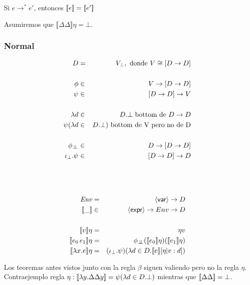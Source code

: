     \begin{corollary}
      Si $e \to^{\ast} e'$, entonces $[\![e]\!] = [\![e']\!]$
    \end{corollary}
        
    \PN Asumiremos que $\llbracket\Delta \Delta\rrbracket\eta = \bot$.

    \subsubsection{Normal}
      \begin{multicols}{2}
        \begin{eqnarray*}
          D &=& V_\bot, \text{ donde } V \cong [D \to  D] \\ \\
          \phi &\in& V \to  [D \to  D] \\
          \psi &\in& [D \to  D] \to  V \\ \\ 
          \lambda d &\in& D. \bot \text{ bottom de } D \rightarrow D \\
          \psi(\lambda d &\in& D. \bot) \text{ bottom de V pero no de D} \\ \\
          \phi_{\botbot} &\in& D \to  [D \to  D] \\
          \iota_\bot . \psi &\in& [D \to  D] \to  D
        \end{eqnarray*}
        \begin{eqnarray*}
          \\ \\ \\
          \Env &=& \var \to  D \\
          \llbracket\_\rrbracket &\in& \expr \to  Env \to  D \\ \\
          \llbracket v \rrbracket\eta &=& \eta v \\
          \llbracket e_0\, e_1\rrbracket\eta &=& \phi_{\botbot} (\llbracket e_0\rrbracket\eta) (\llbracket e_1\rrbracket\eta) \\
          \llbracket\lambda x.e\rrbracket\eta &=& (\iota_\bot . \psi)(\lambda d \in D. \llbracket e\rrbracket[\eta|v:d])
        \end{eqnarray*}
      \end{multicols}
      \PN Los teoremas antes vistos junto con la regla $\beta$ siguen valiendo pero no la regla $\eta$.
      \PN Contraejemplo regla $\eta: [\![\lambda y. \Delta\Delta y]\!] = \psi(\lambda d \in D.\bot)$ mientras que $[\![\Delta\Delta]\!] = \bot$.    


